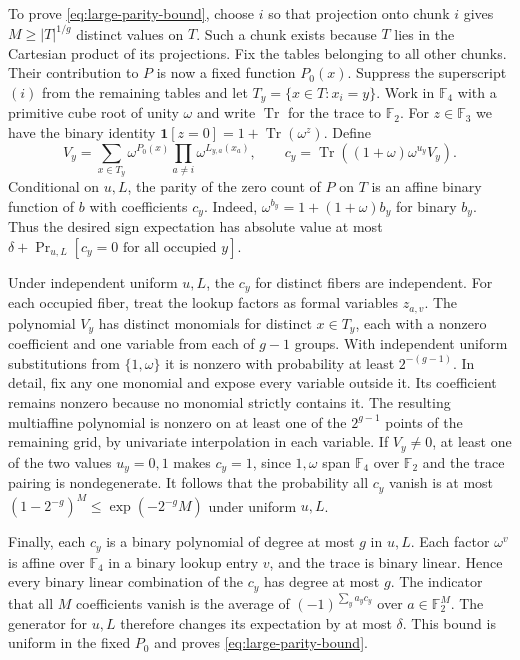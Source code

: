 \documentclass[11pt]{article}
\begin{document}
To prove \eqref{eq:large-parity-bound}, choose $i$ so that projection
onto chunk $i$ gives $M\ge |T|^{1/g}$ distinct values on $T$. Such
a chunk exists because $T$ lies in the Cartesian product of its
projections. Fix the tables belonging to all other chunks. Their
contribution to $P$ is now a fixed function $P_0(x)$. Suppress
the superscript $(i)$ from the remaining tables and let
$T_y=\{x\in T:x_i=y\}$. Work in $\mathbb F_4$ with a primitive cube
root of unity $\omega$ and write $\operatorname{Tr}$ for the trace to
$\mathbb F_2$. For $z\in\mathbb F_3$ we have the binary identity
$\mathbf 1[z=0]=1+\operatorname{Tr}(\omega^z)$. Define
\[
 V_y=\sum_{x\in T_y}\omega^{P_0(x)}
                   \prod_{a\ne i}\omega^{L_{y,a}(x_a)},\qquad
 c_y=\operatorname{Tr}\!\left((1+\omega)\omega^{u_y}V_y\right).
\]
Conditional on $u,L$, the parity of the zero count of $P$ on $T$ is
an affine binary function of $b$ with coefficients $c_y$. Indeed,
$\omega^{b_y}=1+(1+\omega)b_y$ for binary $b_y$. Thus the desired
sign expectation has absolute value at most
$\delta+\Pr_{u,L}[c_y=0\text{ for all occupied }y]$.

Under independent uniform $u,L$, the $c_y$ for distinct fibers are
independent. For each occupied fiber, treat the lookup factors as
formal variables $z_{a,v}$. The polynomial $V_y$ has distinct
monomials for distinct $x\in T_y$, each with a nonzero coefficient
and one variable from each of $g-1$ groups. With independent
uniform substitutions from $\{1,\omega\}$ it is nonzero with
probability at least $2^{-(g-1)}$. In detail, fix any one monomial
and expose every variable outside it. Its coefficient remains
nonzero because no monomial strictly contains it. The resulting
multiaffine polynomial is nonzero on at least one of the
$2^{g-1}$ points of the remaining grid, by univariate interpolation
in each variable. If $V_y\ne0$, at least one of the two values
$u_y=0,1$ makes $c_y=1$, since $1,\omega$ span $\mathbb F_4$ over
$\mathbb F_2$ and the trace pairing is nondegenerate. It follows
that the probability all $c_y$ vanish is at most
$(1-2^{-g})^M\le \exp(-2^{-g} M)$ under uniform $u,L$.

Finally, each $c_y$ is a binary polynomial of degree at most $g$
in $u,L$. Each factor $\omega^v$ is affine over $\mathbb F_4$ in
a binary lookup entry $v$, and the trace is binary linear. Hence
every binary linear combination of the $c_y$ has degree at most
$g$. The indicator that all $M$ coefficients vanish is the average
of $(-1)^{\sum_y a_y c_y}$ over $a\in\mathbb F_2^M$. The generator
for $u,L$ therefore changes its expectation by at most $\delta$.
This bound is uniform in the fixed $P_0$ and proves
\eqref{eq:large-parity-bound}.
\end{document}
